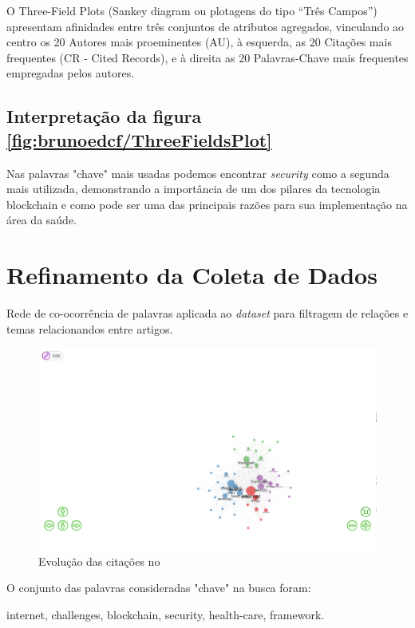 O Three-Field Plots (Sankey diagram ou plotagens do tipo “Três Campos”) apresentam afinidades entre três conjuntos de atributos agregados,
vinculando ao centro os 20 Autores mais proeminentes (AU), à esquerda, as 20 Citações mais frequentes (CR - Cited Records), e à direita
as 20 Palavras-Chave mais frequentes empregadas pelos autores.

\subsection{Interpretação da figura \ref{fig:brunoedcf/ThreeFieldsPlot}}

Nas palavras "chave" mais usadas podemos encontrar \textit{security} como a segunda mais utilizada, demonstrando a importância de um dos pilares
da tecnologia blockchain e como pode ser uma das principais razões para sua implementação na área da saúde. 

\section{Refinamento da Coleta de Dados}

Rede de co-ocorrência de palavras aplicada ao \textit{dataset} para filtragem de relações e temas relacionandos entre artigos.

\begin{figure}[H]
    \centering
    \includegraphics[width=1\textwidth]{experiments/brunoedcf/AnaliseBibliometrica/BlockchainInHealth/Figures/WordOccurrNet.png}
    \caption{Evolução das citações no \dataset}
    \label{fig:brunoedcf/WordOccurrNet}
\end{figure}

O conjunto das palavras consideradas "chave" na busca foram: 

internet, challenges, blockchain, security, health-care, framework.
